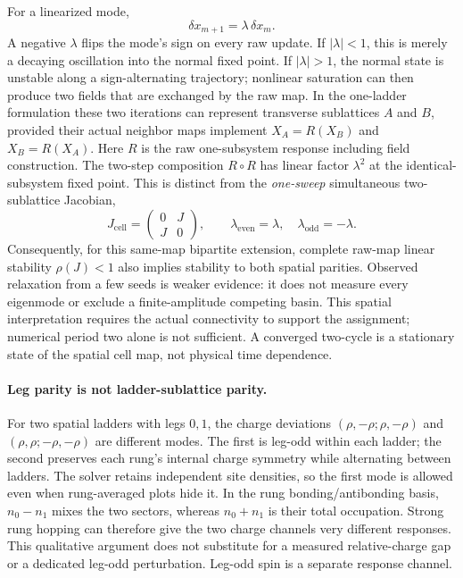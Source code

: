 \documentclass[11pt]{article}
\begin{document}
For a linearized mode,
\begin{equation}
 \delta x_{m+1}=\lambda\,\delta x_m.
\end{equation}
A negative \(\lambda\) flips the mode's sign on every raw update.  If
\(|\lambda|<1\), this is merely a decaying oscillation into the normal fixed
point.  If \(|\lambda|>1\), the normal state is unstable along a
sign-alternating trajectory; nonlinear saturation can then produce two fields
that are exchanged by the raw map.  In the one-ladder formulation these two
iterations can represent transverse sublattices \(A\) and \(B\), provided
their actual neighbor maps implement \(X_A=R(X_B)\) and \(X_B=R(X_A)\).
Here \(R\) is the raw one-subsystem response including field construction.
The two-step composition \(R\circ R\) has linear factor \(\lambda^2\)
at the identical-subsystem fixed point. This is distinct from the
\emph{one-sweep} simultaneous two-sublattice Jacobian,
\begin{equation}
 J_{\mathrm{cell}}=\begin{pmatrix}0&J\\J&0\end{pmatrix},
 \qquad \lambda_{\mathrm{even}}=\lambda,
 \quad \lambda_{\mathrm{odd}}=-\lambda.
 \label{eq:spatial-cell-jacobian}
\end{equation}
Consequently, for this same-map bipartite extension, complete raw-map linear
stability \(\rho(J)<1\) also implies stability to both spatial parities.
Observed relaxation from a few seeds is weaker evidence: it does not measure
every eigenmode or exclude a finite-amplitude competing basin. This spatial
interpretation requires the actual connectivity to support the assignment;
numerical period two alone is not sufficient. A converged two-cycle is a
stationary state of the spatial cell map, not physical time dependence.

\paragraph{Leg parity is not ladder-sublattice parity.}
For two spatial ladders with legs \(0,1\), the charge deviations
\((\rho,-\rho;\rho,-\rho)\) and
\((\rho,\rho;-\rho,-\rho)\) are different modes. The first is leg-odd
within each ladder; the second preserves each rung's internal charge symmetry
while alternating between ladders. The solver retains independent site
densities, so the first mode is allowed even when rung-averaged plots hide it.
In the rung bonding/antibonding basis, \(n_0-n_1\) mixes the two sectors,
whereas \(n_0+n_1\) is their total occupation. Strong rung hopping can therefore
give the two charge channels very different responses. This qualitative
argument does not substitute for a measured relative-charge gap or a dedicated
leg-odd perturbation. Leg-odd spin is a separate response channel.
\end{document}
